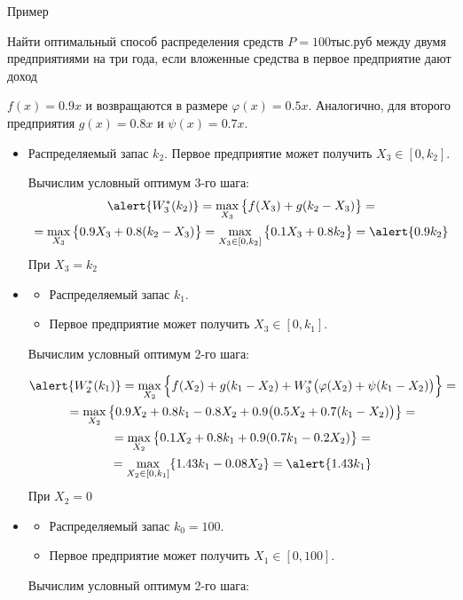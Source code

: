 \documentclass[unicode,11pt,notheorems,xcolor=table]{beamer}
\begin{document}
\begin{frame}[allowframebreaks]{Пример}
\begin{exampleblock}{}
Найти оптимальный способ распределения средств $P = 100$\;тыс.\;руб между двумя предприятиями на три года, если вложенные средства в первое предприятие дают доход 

$f(x) = 0.9x$ и возвращаются в размере $\varphi(x) = 0.5x$. 
Аналогично, для второго предприятия $g(x)=0.8x$ и $\psi(x)=0.7x$. 
\end{exampleblock}

\begin{itemize}
\item 
	 Распределяемый запас $k_2$.
	Первое предприятие может получить $X_3 \in [0,k_2]$.
	
	Вычислим условный оптимум 3-го шага:
\begin{multline*}
\alert{W^*_3(k_{2})} 
	= \max_{X_3} \big\{f(X_3)+g(k_{2}-X_3)\big\}
	=\\	
	= \max_{X_3} \big\{0.9X_3+ 0.8(k_2-X_3) \big\}
	= \max_{X_3\in[0,k_2]} \big\{0.1X_3 + 0.8k_2 \big\}
	= \alert{0.9k_2}
\end{multline*}
При $X_3=k_2$

\framebreak
\item 
{}
	\begin{itemize}
	\item 
		Распределяемый запас $k_1$.
	\item 
		Первое предприятие может получить $X_3 \in [0,k_1]$.
	\end{itemize}
	Вычислим условный оптимум 2-го шага:

\vspace{-10pt}
\begin{multline*}
	\alert{W^*_2(k_{1})} = \max_{X_2} \Big\{f(X_2)+g(k_{1}-X_2) + W^*_{3} \big(\varphi(X_2)+\psi(k_{1}-X_{2})\big)\Big\}
	=\\
	=\max_{X_2} \big\{0.9X_2+0.8k_{1}-0.8X_2 + 0.9 \big(0.5X_2+0.7(k_{1}-X_{2})\big)\big\}	
	=\\
	=\max_{X_2} \big\{0.1X_2 + 0.8k_{1} + 0.9(0.7k_{1}-0.2X_{2})\big\}	
	=\\
	=\max_{X_2\in[0,k_1]} \{1.43k_{1} -0.08X_{2} \}	
	= \alert{1.43 k_1}
\end{multline*}
При $X_2=0$


\framebreak
\item 
{}
	\begin{itemize}
	\item 
		Распределяемый запас $k_0=100$.
	\item 
		Первое предприятие может получить $X_1 \in [0,100]$.
	\end{itemize}
	Вычислим условный оптимум 2-го шага:



\end{itemize}
\end{frame}
\end{document}

